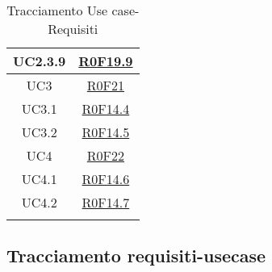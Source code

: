 \documentclass[../AnalisiDeiRequisiti.tex]{subfiles}
\begin{document}
\begin{longtable}{|c|c|}
	UC2.3.9 & \hyperlink{R0F19.9}{R0F19.9}\\\hline
	UC3 & \hyperlink{R0F21}{R0F21}\\\hline
	UC3.1 & \hyperlink{R0F14.4}{R0F14.4}\\\hline
	UC3.2 & \hyperlink{R0F14.5}{R0F14.5}\\\hline
	UC4 & \hyperlink{R0F22}{R0F22}\\\hline
	UC4.1 & \hyperlink{R0F14.6}{R0F14.6}\\\hline
	UC4.2 & \hyperlink{R0F14.7}{R0F14.7}\\\hline
	\caption[Tracciamento Use case-Requisiti]{Tracciamento Use case-Requisiti}
	\label{tabella:usecase-requi}
\end{longtable}
\clearpage
\subsection{Tracciamento requisiti-usecase}
\normalsize
\end{document}
